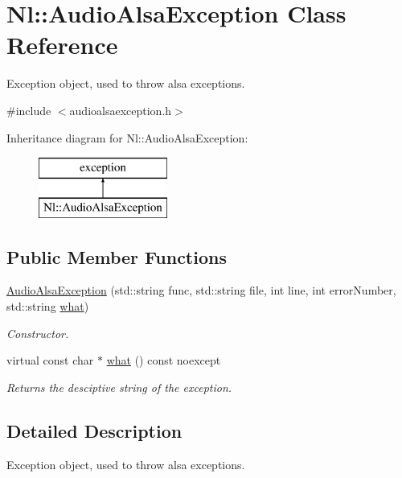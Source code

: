 \hypertarget{classNl_1_1AudioAlsaException}{\section{Nl\-:\-:Audio\-Alsa\-Exception Class Reference}
\label{classNl_1_1AudioAlsaException}
}


Exception object, used to throw alsa exceptions.  




{\ttfamily \#include $<$audioalsaexception.\-h$>$}

Inheritance diagram for Nl\-:\-:Audio\-Alsa\-Exception\-:\begin{figure}[H]
\begin{center}
\leavevmode
\includegraphics[height=2.000000cm]{classNl_1_1AudioAlsaException}
\end{center}
\end{figure}
\subsection*{Public Member Functions}
\begin{DoxyCompactItemize}
\item 
\hyperlink{group__Audio_ga6c40dfc626db2587fc521cd9778fbc24}{Audio\-Alsa\-Exception} (std\-::string func, std\-::string file, int line, int error\-Number, std\-::string \hyperlink{group__Audio_gae17c2bd37874966590d2866c9eddcdd7}{what})
\begin{DoxyCompactList}\small\item\em Constructor. \end{DoxyCompactList}\item 
virtual const char $\ast$ \hyperlink{group__Audio_gae17c2bd37874966590d2866c9eddcdd7}{what} () const noexcept
\begin{DoxyCompactList}\small\item\em Returns the desciptive string of the exception. \end{DoxyCompactList}\end{DoxyCompactItemize}


\subsection{Detailed Description}
Exception object, used to throw alsa exceptions. 


